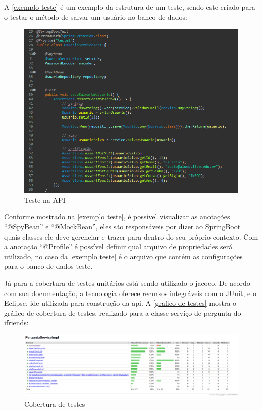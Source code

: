 A \autoref{exemplo teste} é um exemplo da estrutura de um teste, sendo este criado para o testar o método de salvar um usuário no banco de dados:

\begin{figure}[htb]
\centering
\caption{\label{exemplo teste} Teste na API}
\includegraphics[width=1\textwidth]{anexos/Imagens_Testes/API_teste.png}
\end{figure}
\FloatBarrier

Conforme mostrado na \autoref{exemplo teste}, é possível visualizar as anotações ``@SpyBean'' e ``@MockBean'', eles são responsáveis por dizer ao \gls{SpringBoot} quais classes ele deve gerenciar e trazer para dentro do seu próprio contexto. Com a anotação ``@Profile'' é possível definir qual arquivo de propriedades será utilizado, no caso da \autoref{exemplo teste} é o arquivo que contém as configurações para o banco de dados teste.

Já para a cobertura de testes unitários está sendo utilizado o \acs{jacoco}. De acordo com sua documentação, a tecnologia oferece recursos integráveis com o \gls{JUnit}, e o \gls{Eclipse}, \acs{ide} utilizada para construção da \acs{api}. A \autoref{grafico de testes} mostra o gráfico de cobertura de testes, realizado para a classe serviço de pergunta do \gls{ifriends}:

\begin{figure}[htb]
\centering
\caption{\label{grafico de testes} Cobertura de testes}
\includegraphics[width=1\textwidth]{anexos/Imagens_Testes/API_grafico-testes.png}
\end{figure}
\FloatBarrier


